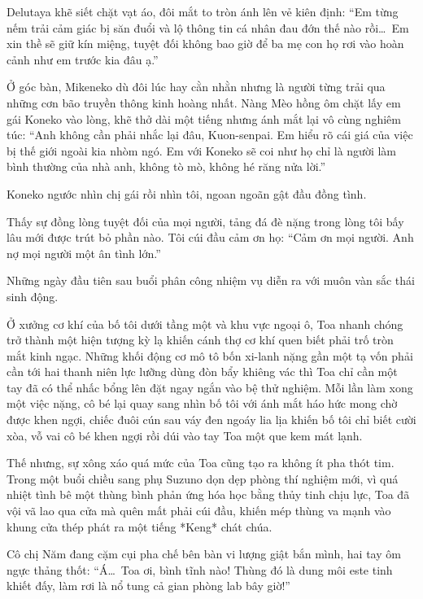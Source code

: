 \documentclass[../main.tex]{subfiles}
\begin{document}
Delutaya khẽ siết chặt vạt áo, đôi mắt to tròn ánh lên vẻ kiên định: ``Em từng nếm trải cảm giác bị săn đuổi và lộ thông tin cá nhân đau đớn thế nào rồi\dots\ Em xin thề sẽ giữ kín miệng, tuyệt đối không bao giờ để ba mẹ con họ rơi vào hoàn cảnh như em trước kia đâu ạ.''

Ở góc bàn, Mikeneko dù đôi lúc hay cằn nhằn nhưng là người từng trải qua những cơn bão truyền thông kinh hoàng nhất. Nàng Mèo hồng ôm chặt lấy em gái Koneko vào lòng, khẽ thở dài một tiếng nhưng ánh mắt lại vô cùng nghiêm túc: ``Anh không cần phải nhắc lại đâu, Kuon-senpai. Em hiểu rõ cái giá của việc bị thế giới ngoài kia nhòm ngó. Em với Koneko sẽ coi như họ chỉ là người làm bình thường của nhà anh, không tò mò, không hé răng nửa lời.''

Koneko ngước nhìn chị gái rồi nhìn tôi, ngoan ngoãn gật đầu đồng tình.

Thấy sự đồng lòng tuyệt đối của mọi người, tảng đá đè nặng trong lòng tôi bấy lâu mới được trút bỏ phần nào. Tôi cúi đầu cảm ơn họ: ``Cảm ơn mọi người. Anh nợ mọi người một ân tình lớn.''

\ct

Những ngày đầu tiên sau buổi phân công nhiệm vụ diễn ra với muôn vàn sắc thái sinh động.

Ở xưởng cơ khí của bố tôi dưới tầng một và khu vực ngoại ô, Toa nhanh chóng trở thành một hiện tượng kỳ lạ khiến cánh thợ cơ khí quen biết phải trố tròn mắt kinh ngạc. Những khối động cơ mô tô bốn xi-lanh nặng gần một tạ vốn phải cần tới hai thanh niên lực lưỡng dùng đòn bẩy khiêng vác thì Toa chỉ cần một tay đã có thể nhấc bổng lên đặt ngay ngắn vào bệ thử nghiệm. Mỗi lần làm xong một việc nặng, cô bé lại quay sang nhìn bố tôi với ánh mắt háo hức mong chờ được khen ngợi, chiếc đuôi cún sau váy đen ngoáy lia lịa khiến bố tôi chỉ biết cười xòa, vỗ vai cô bé khen ngợi rồi dúi vào tay Toa một que kem mát lạnh.

Thế nhưng, sự xông xáo quá mức của Toa cũng tạo ra không ít pha thót tim. Trong một buổi chiều sang phụ Suzuno dọn dẹp phòng thí nghiệm mới, vì quá nhiệt tình bê một thùng bình phản ứng hóa học bằng thủy tinh chịu lực, Toa đã vội vã lao qua cửa mà quên mất phải cúi đầu, khiến mép thùng va mạnh vào khung cửa thép phát ra một tiếng *Keng* chát chúa.

Cô chị Năm đang cặm cụi pha chế bên bàn vi lượng giật bắn mình, hai tay ôm ngực thảng thốt: ``Á\dots\ Toa ơi, bình tĩnh nào! Thùng đó là dung môi este tinh khiết đấy, làm rơi là nổ tung cả gian phòng lab bây giờ!''
\end{document}
